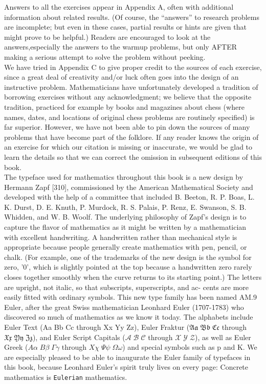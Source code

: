 \documentclass[a4paper]{article}
\begin{document}
Answers to all the exercises appear in Appendix A, often with additional information about related results. (Of course, the ``answers'' to research problems are incomplete; but even in these cases, partial results or hints are given that might prove to be helpful.) Readers are encouraged to look at the answers,especially the answers to the warmup problems, but only AFTER making a
serious attempt to solve the problem without peeking. \\
\indent We have tried in Appendix C to give proper credit to the sources of each exercise, since a great deal of creativity and/or luck often goes into the design of an instructive problem. Mathematicians have unfortunately developed a tradition of borrowing exercises without any acknowledgment; we believe that the opposite tradition, practiced for example by books and
magazines about chess (where names, dates, and locations of original chess
problems are routinely specified) is far superior. However, we have not been able to pin down the sources of many problems that have become part of the
folklore. If any reader knows the origin of an exercise for which our citation
is missing or inaccurate, we would be glad to learn the details so that we can
correct the omission in subsequent editions of this book.\\
\indent The typeface used for mathematics throughout this book is a new design
by Hermann Zapf [310], commissioned by the American Mathematical Society
and developed with the help of a committee that included B. Beeton, R. P.
Boas, L. K. Durst, D. E. Knuth, P. Murdock, R. S. Palais, P. Renz, E. Swanson,
S. B. Whidden, and W. B. Woolf. The underlying philosophy of Zapf's design
is to capture the flavor of mathematics as it might be written by a mathematician with excellent handwriting. A handwritten rather than mechanical style is appropriate because people generally create mathematics with pen, pencil, or chalk. (For example, one of the trademarks of the new design is the symbol for zero, '0', which is slightly pointed at the top because a handwritten zero
rarely closes together smoothly when the curve returns to its starting point.)
The letters are upright, not italic, so that subscripts, superscripts, and ac-
cents are more easily fitted with ordinary symbols. This new type family has
been named AM.9 Euler, after the great Swiss mathematician Leonhard Euler
(1707-1783) who discovered so much of mathematics as we know it today.
The alphabets include Euler Text (Aa Bb Cc through Xx Yy Zz), Euler Fraktur ($\mathfrak{Aa\; Bb\; Cc}$ through $\mathfrak{Xx\; Yy\; Zz}$), and Euler Script Capitals ($\mathscr{A\; B\; C}$ through $\mathscr{X \; Y\; Z}$), as well as Euler Greek ($\mathord{A \alpha\; B \beta\; \Gamma \gamma }$ through $\mathord{X \chi\; \Psi \psi\; \Omega \omega}$) and special symbols such as p and K. We are especially pleased to be able to inaugurate the Euler family of typefaces in this book, because Leonhard Euler's spirit truly lives on every page: Concrete mathematics is {\tt Eulerian} mathematics. \\
\end{document}
